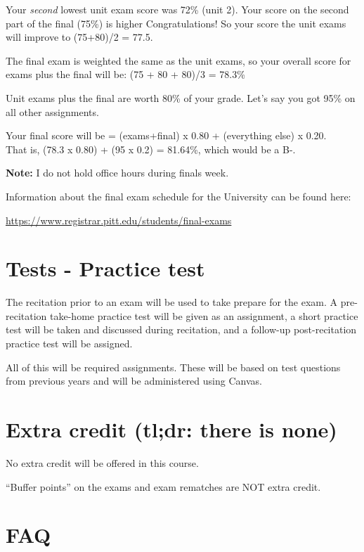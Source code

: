 \documentclass[
]{book}
\begin{document}
Your \emph{second} lowest unit exam score was 72\% (unit 2). Your score on the second part of the final (75\%) is higher Congratulations! So your score the unit exams will improve to (75+80)/2 = 77.5.

The final exam is weighted the same as the unit exams, so your overall score for exams plus the final will be: (75 + 80 + 80)/3 = 78.3\%

Unit exams plus the final are worth 80\% of your grade. Let's say you got 95\% on all other assignments.

Your final score will be = (exams+final) x 0.80 + (everything else) x 0.20.\\
That is, (78.3 x 0.80) + (95 x 0.2) = 81.64\%, which would be a B-.

\textbf{Note: }I do not hold office hours during finals week.

Information about the final exam schedule for the University can be found here:

\url{https://www.registrar.pitt.edu/students/final-exams}

\hypertarget{tests---practice-test}{%
\chapter{Tests - Practice test}\label{tests---practice-test}}

The recitation prior to an exam will be used to take prepare for the exam. A pre-recitation take-home practice test will be given as an assignment, a short practice test will be taken and discussed during recitation, and a follow-up post-recitation practice test will be assigned.

All of this will be required assignments. These will be based on test questions from previous years and will be administered using Canvas.

\hypertarget{extra-credit-tldr-there-is-none}{%
\chapter{Extra credit (tl;dr: there is none)}\label{extra-credit-tldr-there-is-none}}

No extra credit will be offered in this course.

``Buffer points'' on the exams and exam rematches are NOT extra credit.

\hypertarget{faq}{%
\chapter{FAQ}\label{faq}}
\end{document}
